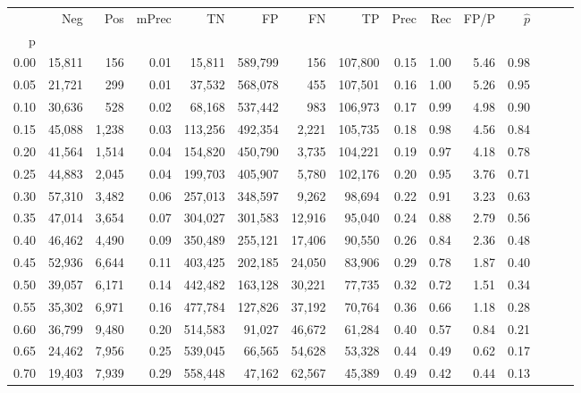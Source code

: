 \begin{tabular}{rrrrrrrrrrrrrrr}
\toprule
{} &     Neg &    Pos & mPrec &       TN &       FP &       FN &       TP &  Prec &   Rec &  FP/P & $\hat{p}$ \\
p    &         &        &       &          &          &          &          &       &       &       &           \\
\midrule
0.00 &  15,811 &    156 &  0.01 &   15,811 &  589,799 &      156 &  107,800 &  0.15 &  1.00 &  5.46 &      0.98 \\
0.05 &  21,721 &    299 &  0.01 &   37,532 &  568,078 &      455 &  107,501 &  0.16 &  1.00 &  5.26 &      0.95 \\
0.10 &  30,636 &    528 &  0.02 &   68,168 &  537,442 &      983 &  106,973 &  0.17 &  0.99 &  4.98 &      0.90 \\
0.15 &  45,088 &  1,238 &  0.03 &  113,256 &  492,354 &    2,221 &  105,735 &  0.18 &  0.98 &  4.56 &      0.84 \\
0.20 &  41,564 &  1,514 &  0.04 &  154,820 &  450,790 &    3,735 &  104,221 &  0.19 &  0.97 &  4.18 &      0.78 \\
0.25 &  44,883 &  2,045 &  0.04 &  199,703 &  405,907 &    5,780 &  102,176 &  0.20 &  0.95 &  3.76 &      0.71 \\
0.30 &  57,310 &  3,482 &  0.06 &  257,013 &  348,597 &    9,262 &   98,694 &  0.22 &  0.91 &  3.23 &      0.63 \\
0.35 &  47,014 &  3,654 &  0.07 &  304,027 &  301,583 &   12,916 &   95,040 &  0.24 &  0.88 &  2.79 &      0.56 \\
0.40 &  46,462 &  4,490 &  0.09 &  350,489 &  255,121 &   17,406 &   90,550 &  0.26 &  0.84 &  2.36 &      0.48 \\
0.45 &  52,936 &  6,644 &  0.11 &  403,425 &  202,185 &   24,050 &   83,906 &  0.29 &  0.78 &  1.87 &      0.40 \\
0.50 &  39,057 &  6,171 &  0.14 &  442,482 &  163,128 &   30,221 &   77,735 &  0.32 &  0.72 &  1.51 &      0.34 \\
0.55 &  35,302 &  6,971 &  0.16 &  477,784 &  127,826 &   37,192 &   70,764 &  0.36 &  0.66 &  1.18 &      0.28 \\
0.60 &  36,799 &  9,480 &  0.20 &  514,583 &   91,027 &   46,672 &   61,284 &  0.40 &  0.57 &  0.84 &      0.21 \\
0.65 &  24,462 &  7,956 &  0.25 &  539,045 &   66,565 &   54,628 &   53,328 &  0.44 &  0.49 &  0.62 &      0.17 \\
0.70 &  19,403 &  7,939 &  0.29 &  558,448 &   47,162 &   62,567 &   45,389 &  0.49 &  0.42 &  0.44 &      0.13 \\

\end{tabular}
